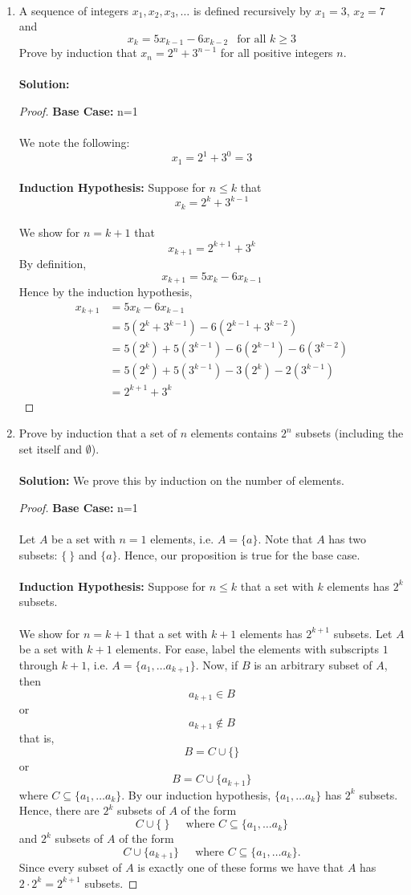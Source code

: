 \documentclass[12pt,letterpaper]{article}
\theoremstyle{plain}
\theoremstyle{definition}
\begin{document}
\ \\
\begin{enumerate}[1.]
\item A sequence of integers $x_1, x_2, x_3,\ldots $ is defined recursively by $x_1=3$, $x_2=7$ and
\[x_k=5x_{k-1}-6x_{k-2}\ \ \text{ for all }k\geq 3\]
Prove by induction that $x_n=2^n+3^{n-1}$ for all positive integers $n$. \\
\ \\
{\bf Solution:}
\begin{proof}
{\bf Base Case:} n=1\\
\ \\
We note the following:
\[ x_1=2^1+3^0=3\]
\ \\
{\bf Induction Hypothesis:} Suppose for $n\leq k$ that 
\[x_k=2^k+3^{k-1}\]
\ \\
We show for $n=k+1$ that 
\[x_{k+1}=2^{k+1}+3^{k}\]
By definition, 
\[x_{k+1}=5x_k-6x_{k-1}\]
Hence by the induction hypothesis, 
\begin{align*}
x_{k+1}&=5x_k-6x_{k-1}\\
&=5(2^{k}+3^{k-1})-6(2^{k-1}+3^{k-2})\\
&=5(2^{k})+5(3^{k-1})-6(2^{k-1})-6(3^{k-2})\\
&=5(2^{k})+5(3^{k-1})-3(2^{k})-2(3^{k-1})\\
&=2^{k+1}+3^{k}\
\end{align*}

\end{proof}
\newpage
\item Prove by induction that a set of $n$ elements contains $2^n$ subsets (including the set itself and $\emptyset$).\\
\ \\
{\bf Solution:} We prove this by induction on the number of elements.
\begin{proof}
{\bf Base Case:} n=1\\
\ \\
Let $A$ be a set with $n=1$ elements, i.e. $A=\{a\}$. Note that $A$ has two subsets: $\{\ \}$ and $\{a\}$.  Hence, our proposition is true for the base case. \\
\ \\
{\bf Induction Hypothesis:} Suppose for $n\leq k$ that a set with $k$ elements has $2^k$ subsets. \\
\ \\
We show for $n=k+1$ that a set with $k+1$ elements has $2^{k+1}$ subsets. Let $A$ be a set with $k+1$ elements. For ease, label the elements with subscripts $1$ through $k+1$, i.e. $A=\{a_1,\ldots a_{k+1}\}$. Now, if $B$ is an arbitrary subset of $A$, then 
\[a_{k+1}\in B\]
or 
\[a_{k+1}\not \in B\]
that is, 
\[B=C\cup \{\}\]
or 
\[B=C\cup \{a_{k+1}\}\]
where $C\subseteq \{a_1,\ldots a_k\}$. By our induction hypothesis, $\{a_1,\ldots a_k\}$ has $2^k$ subsets. Hence, there are $2^k$ subsets of $A$ of the form 
\[C\cup \{\ \}\ \ \ \ \ \text{ where }C\subseteq \{a_1,\ldots a_{k}\}\] and $2^k$ subsets of $A$ of the form 
\[C\cup \{a_{k+1}\}\ \ \ \ \ \text{ where }C\subseteq \{a_1,\ldots a_{k}\}.\]
Since every subset of $A$ is exactly one of these forms we have that $A$ has $2\cdot 2^{k}=2^{k+1}$ subsets. 



\end{proof}
\end{enumerate}
\end{document}
